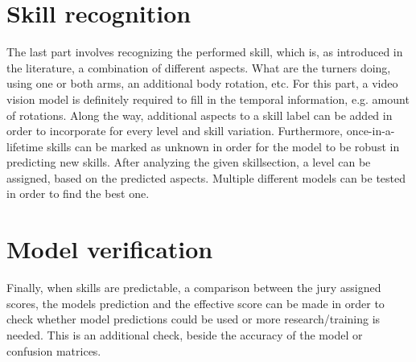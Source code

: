 \section{Skill recognition}

The last part involves recognizing the performed skill, which is, as introduced in the literature, a combination of different aspects. What are the turners doing, using one or both arms, an additional body rotation, etc.
For this part, a video vision model is definitely required to fill in the temporal information, e.g. amount of rotations.
Along the way, additional aspects to a skill label can be added in order to incorporate for every level and skill variation.
Furthermore, once-in-a-lifetime skills can be marked as unknown in order for the model to be robust in predicting new skills. After analyzing the given skillsection, a level can be assigned, based on the predicted aspects.
Multiple different models can be tested in order to find the best one.


\section{Model verification}

Finally, when skills are predictable, a comparison between the jury assigned scores, the models prediction and the effective score can be made in order to check whether model predictions could be used or more research/training is needed. This is an additional check, beside the accuracy of the model or confusion matrices.

